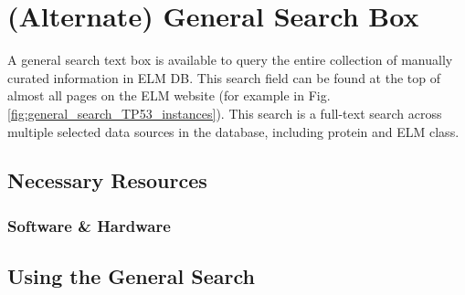 \section{(Alternate) General Search Box}
\label{sec:general_search}

A general search text box is available to query the entire collection of
manually curated information in ELM DB. This search field can be found at the
top of almost all pages on the ELM website (for example in Fig.
\ref{fig:general_search_TP53_instances}). This search is a full-text
search across multiple selected data sources in the database, including
protein and ELM class. 

%
%
\subsection{Necessary Resources}
\subsubsection{Software \& Hardware}
%

%
%
\subsection{Using the General Search}
\label{subsec:general_search_using}


